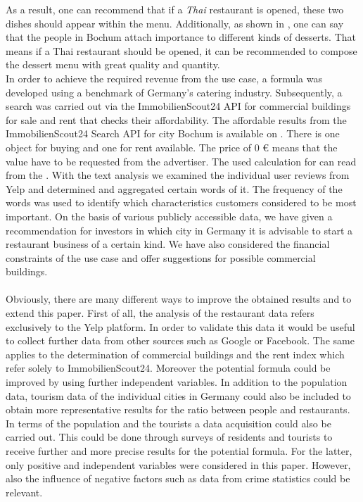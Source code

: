 As a result, one can recommend that if a \textit{Thai} restaurant is opened, these two dishes should appear within the menu. Additionally, as shown in , one can say that the people in Bochum attach importance to different kinds of desserts. That means if a Thai restaurant should be opened, it can be recommended to compose the dessert menu with great quality and quantity.\\
In order to achieve the required revenue from the use case, a formula was developed using a benchmark of Germany's catering industry. Subsequently, a search was carried out via the ImmobilienScout24 \ac{API} for commercial buildings for sale and rent that checks their affordability. The affordable results from the ImmobilienScout24 Search \ac{API} for city Bochum is available on . There is one object for buying and one for rent available. The price of 0 \euro{} means that the value have to be requested from the advertiser. The used calculation for can read from the .\newline
With the text analysis we examined the individual user reviews from Yelp and determined and aggregated certain words of it. The frequency of the words was used to identify which characteristics customers considered to be most important.\newline
On the basis of various publicly accessible data, we have given a recommendation for investors in which city in Germany it is advisable to start a restaurant business of a certain kind. We have also considered the financial constraints of the use case and offer suggestions for possible commercial buildings.
\\\\
Obviously, there are many different ways to improve the obtained results and to extend this paper. First of all, the analysis of the restaurant data refers exclusively to the Yelp platform. In order to validate this data it would be useful to collect further data from other sources such as Google or Facebook. The same applies to the determination of commercial buildings and the rent index which refer solely to ImmobilienScout24. \newline
Moreover the potential formula could be improved by using further independent variables. In addition to the population data, tourism data of the individual cities in Germany could also be included to obtain more representative results for the ratio between people and restaurants. In terms of the population and the tourists a data acquisition could also be carried out. This could be done through surveys of residents and tourists to receive further and more precise results for the potential formula. For the latter, only positive and independent variables were considered in this paper. However, also the influence of negative factors such as data from crime statistics could be relevant. \newline
